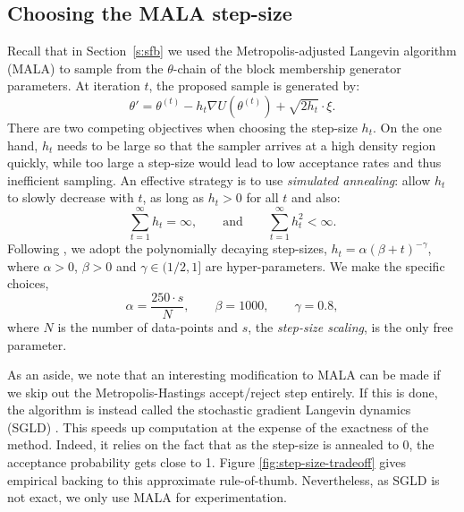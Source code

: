 \subsection{Choosing the MALA step-size}
\label{appdx:step-size}

Recall that in 
Section~\ref{s:sfb} we used 
the Metropolis-adjusted Langevin algorithm (MALA)
to 
sample from the $\theta$-chain of the block membership 
generator parameters.
At iteration $t$, the proposed sample is generated by:
%
\begin{equation}
	\theta' = \theta^{(t)} - h_t \nabla U(\theta^{(t)}) + \sqrt{2h_t} \cdot \xi.
\end{equation}
%
There are two competing objectives when choosing the step-size $h_t$. 
On the one hand, $h_t$ needs to be large so that the sampler
arrives at a high density region quickly,
while too large a step-size would lead to low acceptance rates and thus 
inefficient sampling. An effective strategy is
to use {\em simulated annealing}: allow $h_t$ to slowly decrease
with $t$, as long as $h_t>0$ for all $t$ and also:
%
\begin{equation}
	\sum_{t=1}^{\infty} h_t = \infty, \qquad \textrm{and} \qquad
	\sum_{t=1}^{\infty} h_t^2 < \infty.
	\label{eqn:h-constraints}
\end{equation}
%
Following \citet{Bayesian-SGLD}, we adopt the 
polynomially decaying step-sizes,
%
$h_t = \alpha(\beta + t)^{-\gamma}$,
%
where $\alpha>0$, $\beta>0$ and $\gamma\in(1/2,1]$ are hyper-parameters.
We make the specific choices,
%
\begin{equation}
	\alpha = \frac{250 \cdot s}{N}, \qquad \beta = 1000, \qquad \gamma = 0.8,
	\label{eqn:step-size-params}
\end{equation}
%
where $N$ is the number of data-points and $s$,
the {\em step-size scaling}, is the only free parameter.

As an aside, we note that an interesting modification to MALA can be made if we skip out the Metropolis-Hastings accept/reject step entirely. If this is done, the algorithm is instead called the stochastic gradient Langevin dynamics (SGLD) \cite{Bayesian-SGLD}. This speeds up computation at the expense of the exactness of the method. Indeed, it relies on the fact that as the step-size is annealed to 0, the acceptance probability gets close to 1. Figure \ref{fig:step-size-tradeoff} gives empirical backing to this approximate rule-of-thumb. Nevertheless, as SGLD is not exact, we only use MALA for experimentation.

